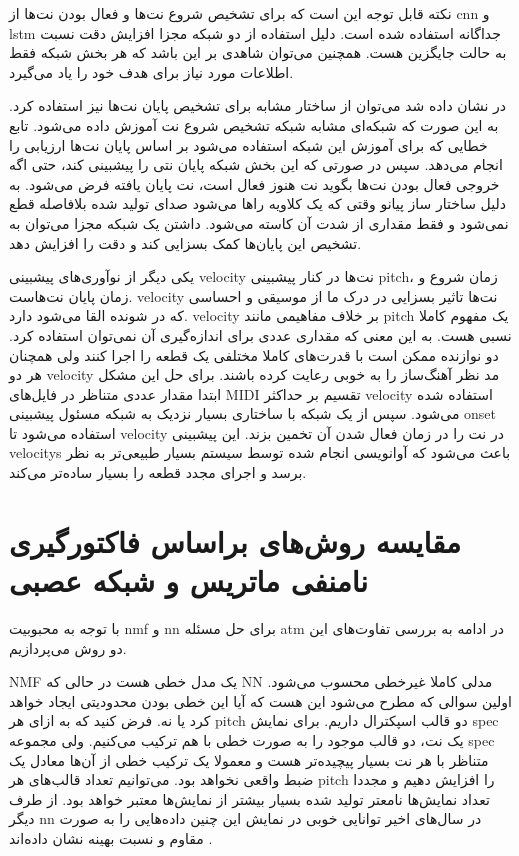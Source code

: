 نکته قابل توجه این است که برای تشخیص شروع نت‌ها و فعال بودن نت‌ها از \gls{cnn} و
\gls{lstm} جداگانه استفاده شده است. دلیل استفاده از دو شبکه مجزا افزایش دقت نسبت
به حالت جایگزین هست. همچنین می‌توان شاهدی بر این باشد که هر بخش شبکه فقط اطلاعات
مورد نیاز برای هدف خود را یاد می‌گیرد.

در \cite{hawthorne2018enabling} نشان داده شد می‌توان از ساختار مشابه برای تشخیص
پایان نت‌ها نیز استفاده کرد. به این صورت که شبکه‌ای مشابه شبکه‌ تشخیص شروع نت
آموزش داده می‌شود. تابع خطایی که برای آموزش این شبکه استفاده می‌شود بر اساس
پایان نت‌ها ارزیابی را انجام می‌دهد. سپس در صورتی که این بخش شبکه پایان نتی را
پیشبینی کند، حتی اگه خروجی فعال بودن نت‌ها بگوید نت هنوز فعال است، نت پایان
یافته فرض می‌شود. به دلیل ساختار ساز پیانو وقتی که یک کلاویه راها می‌شود صدای
تولید شده بلافاصله قطع نمی‌شود و فقط مقداری از شدت آن کاسته می‌شود. داشتن یک
شبکه مجزا می‌توان به تشخیص این پایان‌ها کمک بسزایی کند و دقت را افزایش دهد.

یکی دیگر از نوآوری‌های \cite{hawthorne2017onsets} پیشبینی \gls{velocity} نت‌ها
در کنار پیشبینی \gls{pitch}، زمان شروع و زمان پایان نت‌هاست. \gls{velocity}
نت‌ها تاثیر بسزایی در درک ما از موسیقی و احساسی که در شونده القا می‌شود دارد.
\gls{velocity} بر خلاف مفاهیمی مانند \gls{pitch} یک مفهوم کاملا نسبی هست. به این
معنی که مقداری عددی برای اندازه‌گیری آن نمی‌توان استفاده کرد. دو نوازنده ممکن
است با قدرت‌های کاملا مختلفی یک قطعه را اجرا کنند ولی همچنان هر دو
\gls{velocity} مد نظر آهنگ‌ساز را به خوبی رعایت کرده باشند. برای حل این مشکل
ابتدا مقدار عددی متناظر در فایل‌های \gls{MIDI} تقسیم بر حداکثر \gls{velocity}
استفاده شده می‌شود. سپس از یک شبکه با ساختاری بسیار نزدیک به شبکه مسئول پیشبینی
onset استفاده می‌شود تا \gls{velocity} در نت را در زمان فعال شدن آن تخمین بزند.
این پیشبینی \glspl{velocity} باعث می‌شود که آوانویسی انجام شده توسط سیستم بسیار
طبیعی‌تر به نظر برسد و اجرای مجدد قطعه را بسیار ساده‌تر می‌کند.

\section{مقایسه روش‌های براساس فاکتورگیری نامنفی ماتریس و شبکه عصبی}
با توجه به محبوبیت \gls{nmf} و \gls{nn} برای حل مسئله \gls{atm} در ادامه به
بررسی تفاوت‌های این دو روش می‌پردازیم.

\gls{NMF} یک مدل خطی هست در حالی که \gls{NN} مدلی کاملا غیرخطی محسوب می‌شود.
اولین سوالی که مطرح می‌شود این هست که آیا این خطی بودن محدودیتی ایجاد خواهد کرد
یا نه. فرض کنید که به ازای هر \gls{pitch} دو قالب اسپکترال داریم. برای نمایش
\gls{spec} یک نت، دو قالب موجود را به صورت خطی با هم ترکیب می‌کنیم. ولی مجموعه
\gls{spec} متناظر با هر نت بسیار پیچیده‌تر هست و معمولا یک ترکیب خطی از آن‌ها
معادل یک ضبط واقعی نخواهد بود. می‌توانیم تعداد قالب‌های هر \gls{pitch} را افزایش
دهیم و مجددا تعداد نمایش‌ها نامعتر تولید شده بسیار بیشتر از نمایش‌ها معتبر خواهد
بود. از طرف دیگر \gls{nn} در سال‌های اخیر توانایی خوبی در نمایش این چنین
داده‌هایی را به صورت مقاوم و نسبت بهینه نشان داده‌اند \cite{goodfellow2016deep}.

